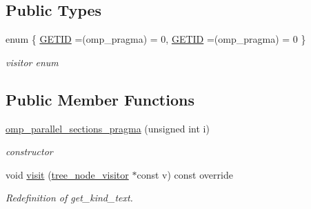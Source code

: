 \subsection*{Public Types}
\begin{DoxyCompactItemize}
\item 
enum \{ \hyperlink{structomp__parallel__sections__pragma_aeb4d8852304fed3518cd7fb7db2c737ca7000460449447027f78da5b2a738b801}{G\+E\+T\+ID} =(omp\+\_\+pragma) = 0, 
\hyperlink{structomp__parallel__sections__pragma_aeb4d8852304fed3518cd7fb7db2c737ca7000460449447027f78da5b2a738b801}{G\+E\+T\+ID} =(omp\+\_\+pragma) = 0
 \}\begin{DoxyCompactList}\small\item\em visitor enum \end{DoxyCompactList}
\end{DoxyCompactItemize}
\subsection*{Public Member Functions}
\begin{DoxyCompactItemize}
\item 
\hyperlink{structomp__parallel__sections__pragma_ae6f2bd789979dfd4c6c7d3387d34a3a6}{omp\+\_\+parallel\+\_\+sections\+\_\+pragma} (unsigned int i)
\begin{DoxyCompactList}\small\item\em constructor \end{DoxyCompactList}\item 
void \hyperlink{structomp__parallel__sections__pragma_a8f7f1c69bd6c94e4fbe53daf45bb33a7}{visit} (\hyperlink{classtree__node__visitor}{tree\+\_\+node\+\_\+visitor} $\ast$const v) const override
\begin{DoxyCompactList}\small\item\em Redefinition of get\+\_\+kind\+\_\+text. \end{DoxyCompactList}\end{DoxyCompactItemize}

